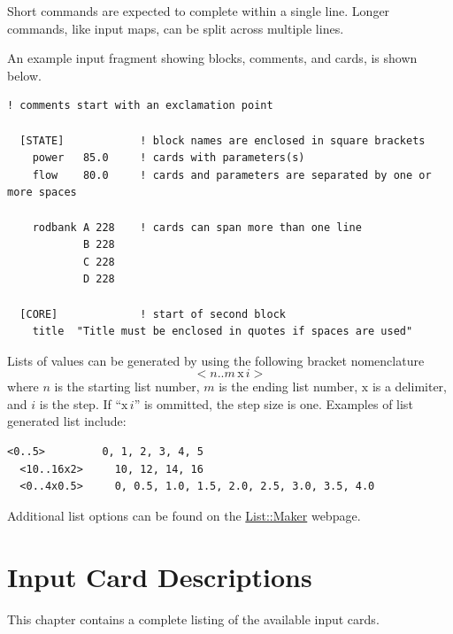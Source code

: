 \documentclass[11pt]{caslreport}
\begin{document}
Short commands are expected to complete within a single line. Longer commands, like input maps,
can be split across multiple lines.

An example input fragment showing blocks, comments, and cards, is shown below.
\begin{Verbatim}[fontsize=\small]
  ! comments start with an exclamation point

  [STATE]            ! block names are enclosed in square brackets
    power   85.0     ! cards with parameters(s)
    flow    80.0     ! cards and parameters are separated by one or more spaces

    rodbank A 228    ! cards can span more than one line
            B 228
            C 228
            D 228

  [CORE]             ! start of second block
    title  "Title must be enclosed in quotes if spaces are used"

\end{Verbatim}

Lists of values can be generated by using the following bracket nomenclature
$$ < n .. m \, \mbox{x} \, i > $$
where $n$ is the starting list number, $m$ is the ending list number, $\mbox{x}$ is a delimiter, and $i$ is the step.
If ``$\mbox{x} \, i$'' is ommitted, the step size is one.
Examples of list generated list include:
\begin{Verbatim}[fontsize=\small]
  <0..5>         0, 1, 2, 3, 4, 5
  <10..16x2>     10, 12, 14, 16
  <0..4x0.5>     0, 0.5, 1.0, 1.5, 2.0, 2.5, 3.0, 3.5, 4.0
\end{Verbatim}
Additional list options can be found on the \href{https://metacpan.org/pod/release/DCONWAY/List-Maker-0.005/lib/List/Maker.pm}{List::Maker} webpage.













\section{Input Card Descriptions} \label{chap:cards}
This chapter contains a complete listing of the available input cards.
\end{document}
